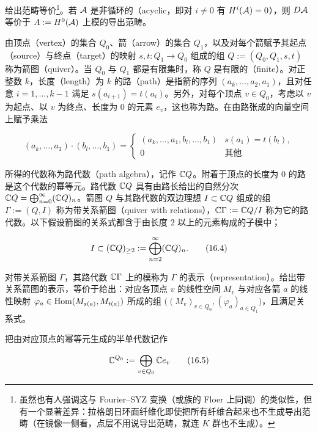 给出范畴等价\footnote{虽然也有人强调这与 Fourier–SYZ 变换（或族的 Floer 上同调）的类似性，但有一个显著差异：拉格朗日环面纤维化即使把所有纤维合起来也不生成导出范畴（在镜像一侧看，点层不用说导出范畴，就连 $K$ 群也不生成）。}。若 $\mathcal{A}$ 是非循环的（acyclic，即对 $i\ne 0$ 有 $H^i(\mathcal{A})=0$），则 $D\mathcal{A}$ 等价于 $A := H^0(\mathcal{A})$ 上模的导出范畴。

由顶点（vertex）的集合 $Q_0$、箭（arrow）的集合 $Q_1$，以及对每个箭赋予其起点（source）与终点（target）的映射 $s,t\colon Q_1\to Q_0$ 组成的组 $Q := (Q_0,Q_1,s,t)$ 称为箭图（quiver）。当 $Q_0$ 与 $Q_1$ 都是有限集时，称 $Q$ 是有限的（finite）。对正整数 $k$，长度（length）为 $k$ 的路（path）是指箭的序列 $(a_k,\dots,a_2,a_1)$，且对任意 $i=1,\dots,k-1$ 满足 $s(a_{i+1})=t(a_i)$。另外，对每个顶点 $v\in Q_0$，考虑以 $v$ 为起点、以 $v$ 为终点、长度为 $0$ 的元素 $e_v$，这也称为路。在由路张成的向量空间上赋予乘法

\begin{equation}
  (a_k,\dots,a_1)\cdot(b_l,\dots,b_1) =
  \begin{cases}
    (a_k,\dots,a_1,b_l,\dots,b_1) & s(a_1)=t(b_l),\\
    0 & \text{其他}
  \end{cases} \tag{16.3}
\end{equation}

所得的代数称为路代数（path algebra），记作 $\mathbb{C} Q$。附着于顶点的长度为 $0$ 的路是这个代数的幂等元。路代数 $\mathbb{C} Q$ 具有由路长给出的自然分次 $\mathbb{C} Q=\bigoplus_{n=0}^{\infty}(\mathbb{C} Q)_n$。箭图 $Q$ 与其路代数的双边理想 $I\subset\mathbb{C} Q$ 组成的组 $\Gamma := (Q,I)$ 称为带关系箭图（quiver with relations），$\mathbb{C}\Gamma := \mathbb{C} Q/I$ 称为它的路代数。以下假设箭图的关系式都含于由长度 $2$ 以上的元素构成的子模中；

\begin{equation}
  I \subset (\mathbb{C} Q)_{\ge 2} := \bigoplus_{n=2}^{\infty}(\mathbb{C} Q)_n. \tag{16.4}
\end{equation}

对带关系箭图 $\Gamma$，其路代数 $\mathbb{C}\Gamma$ 上的模称为 $\Gamma$ 的表示（representation）。给出带关系箭图的表示，等价于给出：对应各顶点 $v$ 的线性空间 $M_v$ 与对应各箭 $a$ 的线性映射 $\varphi_a\in\operatorname{Hom}(M_{s(a)},M_{t(a)})$ 所成的组 $\bigl((M_v)_{v\in Q_0},(\varphi_a)_{a\in Q_1}\bigr)$，且满足关系式。

把由对应顶点的幂等元生成的半单代数记作

\begin{equation}
  \mathbb{C}^{Q_0} := \bigoplus_{v\in Q_0}\mathbb{C} e_v \tag{16.5}
\end{equation}

